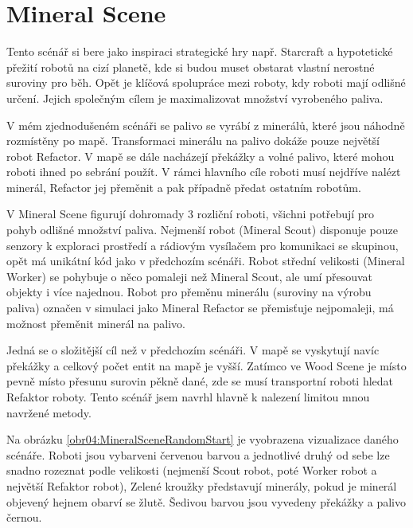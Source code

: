 \section{Mineral Scene}
Tento scénář si bere jako inspiraci strategické hry např. Starcraft \citep*{starcraft} a hypotetické přežití robotů na cizí planetě, kde si budou muset obstarat vlastní nerostné suroviny pro běh. Opět je klíčová spolupráce mezi roboty, kdy roboti mají odlišné určení. Jejich společným cílem je maximalizovat množství vyrobeného paliva.
\par 
V mém zjednodušeném scénáři se palivo se vyrábí z minerálů, které jsou náhodně rozmístěny po mapě. Transformaci minerálu na palivo dokáže pouze největší robot Refactor. V mapě se dále nacházejí překážky a volné palivo, které mohou roboti ihned po sebrání použít. V rámci hlavního cíle roboti musí nejdříve nalézt minerál, Refactor jej přeměnit a pak případně předat ostatním robotům. 
\par
V Mineral Scene figurují dohromady 3 rozliční roboti, všichni potřebují pro pohyb odlišné množství paliva. Nejmenší robot (Mineral Scout) disponuje pouze senzory k exploraci prostředí a rádiovým vysílačem pro komunikaci se skupinou, opět má unikátní kód  jako v předchozím scénáři. Robot střední velikosti (Mineral Worker) se pohybuje o něco pomaleji než Mineral Scout, ale umí přesouvat objekty i více najednou. Robot pro přeměnu minerálu (suroviny na výrobu paliva) označen v simulaci jako Mineral Refactor se přemisťuje nejpomaleji, má možnost přeměnit minerál na palivo. 
\par
Jedná se o složitější cíl než v předchozím scénáři. V mapě se vyskytují navíc překážky a celkový počet entit na mapě je vyšší. Zatímco ve Wood Scene je místo pevně místo přesunu surovin pěkně dané, zde se musí transportní roboti hledat Refaktor roboty. Tento scénář jsem navrhl hlavně k nalezení limitou mnou navržené metody. 
\par 
Na obrázku \ref{obr04:MineralSceneRandomStart} je vyobrazena vizualizace daného scénáře. Roboti jsou vybarveni červenou barvou a jednotlivé druhý od sebe lze snadno rozeznat podle velikosti (nejmenší Scout robot, poté Worker robot a největší Refaktor robot), Zelené kroužky představují minerály, pokud je minerál objevený hejnem obarví se žlutě. Šedivou barvou jsou vyvedeny překážky a palivo černou.
\clearpage

